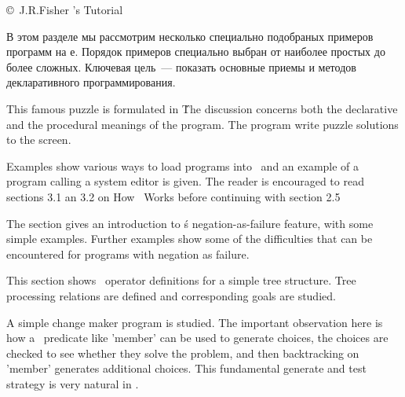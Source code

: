 \secdown

\copyright\ J.R.Fisher 's \prolog
Tutorial\ 

\bigskip





\label{fish2}\secdown

В этом разделе мы рассмотрим несколько специально подобраных примеров программ
на \prolog е. Порядок примеров специально выбран от наиболее простых до более
сложных. Ключевая цель\ --- показать основные приемы 
и методов декларативного программирования. 






This famous puzzle is formulated in \prolog\. The discussion concerns both the
declarative and the procedural meanings of the program. The program write puzzle
solutions to the screen.
 

Examples show various ways to load programs into \prolog\, and an example of a
program calling a system editor is given. The reader is encouraged to read
sections 3.1 an 3.2 on How \prolog\ Works before continuing with section 2.5
 

The section gives an introduction to \prolog\'s negation-as-failure feature, with
some simple examples. Further examples show some of the difficulties that can be
encountered for programs with negation as failure.


This section shows \prolog\ operator definitions for a simple tree structure. Tree
processing relations are defined and corresponding goals are studied.

 
 

A simple change maker program is studied. The important observation here is how
a \prolog\ predicate like 'member' can be used to generate choices, the choices
are checked to see whether they solve the problem, and then backtracking on
'member' generates additional choices. This fundamental generate and test
strategy is very natural in \prolog.

